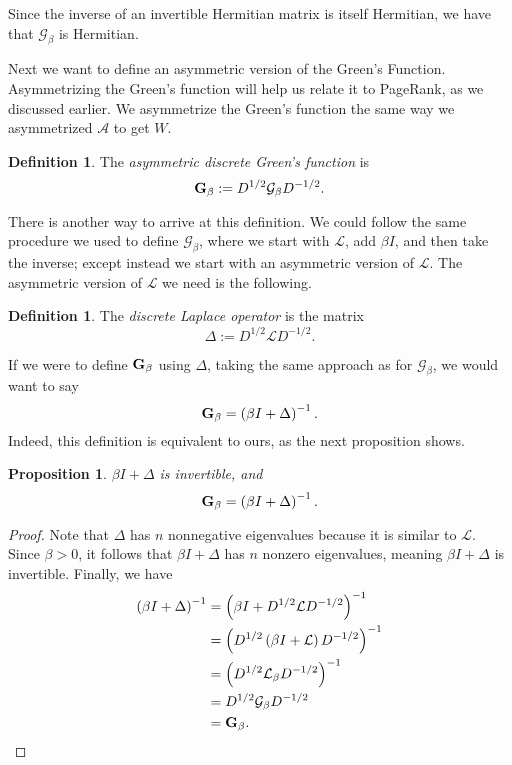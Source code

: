 \documentclass[12pt]{article}
\newtheorem{prop}[thm]{Proposition}
\theoremstyle{definition}
\newtheorem{defn}[thm]{Definition}
\newcommand{\lap}{\mathcal{L}}
\newcommand{\normadj}{\mathcal{A}}
\newcommand{\laplace}{\Delta}
\newcommand{\green}{\mathcal{G}}
\newcommand{\asymgreen}{\normalfont{\textbf{G}}}
\begin{document}
Since the inverse of an invertible Hermitian matrix is itself Hermitian, we have that $\green_\beta$ is Hermitian.

Next we want to define an asymmetric version of the Green's Function. Asymmetrizing the Green's function will help us relate it to PageRank, as we discussed earlier. We asymmetrize the Green's function the same way we asymmetrized $\normadj$ to get $W$.

\begin{defn}
The \textit{asymmetric discrete Green's function} is
$$
\asymgreen_\beta := D^{1/2} \green_\beta D^{-1/2}.
$$
\end{defn}

There is another way to arrive at this definition. We could follow the same procedure we used to define $\green_\beta$, where we start with $\lap$, add $\beta I$, and then take the inverse; except instead we start with an asymmetric version of $\lap$. The asymmetric version of $\lap$ we need is the following.

\begin{defn}
The \textit{discrete Laplace operator} is the matrix
$$
\laplace := D^{1/2} \lap D^{-1/2}.
$$
\end{defn}

If we were to define $\asymgreen_\beta$ using $\laplace$, taking the same approach as for $\green_\beta$, we would want to say $$\asymgreen_\beta = \left( \beta I + \laplace \right)^{-1}.$$ Indeed, this definition is equivalent to ours, as the next proposition shows.

\begin{prop}\label{Asymmetric Green's in terms of Laplace operator}
$\beta I + \laplace$ is invertible, and $$\asymgreen_\beta = \left( \beta I + \laplace \right)^{-1}.$$
\end{prop}
\begin{proof}
Note that $\laplace$ has $n$ nonnegative eigenvalues because it is similar to $\lap$. Since $\beta > 0$, it follows that $\beta I + \laplace$ has $n$ nonzero eigenvalues, meaning $\beta I + \laplace$ is invertible. Finally, we have
\begin{align*}
\left( \beta I + \laplace \right)^{-1}
&= \left( \beta I + D^{1/2} \lap D^{-1/2} \right)^{-1} \\
&= \left(D^{1/2} \left( \beta I + \lap \right) D^{-1/2} \right)^{-1} \\
&= \left(D^{1/2} \lap_\beta D^{-1/2} \right)^{-1} \\
&= D^{1/2} \green_\beta D^{-1/2} \\
&= \asymgreen_\beta.
\end{align*}
\end{proof}
\end{document}
